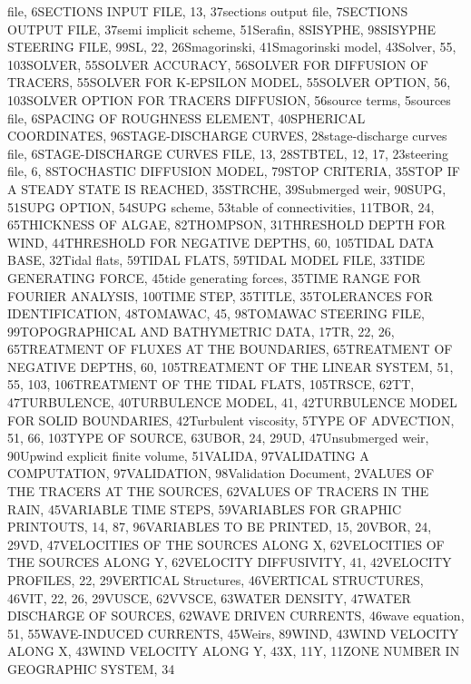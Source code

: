 file, 6SECTIONS INPUT FILE, 13, 37sections output file, 7SECTIONS OUTPUT FILE, 37semi implicit scheme, 51Serafin, 8SISYPHE, 98SISYPHE STEERING FILE, 99SL, 22, 26Smagorinski, 41Smagorinski model, 43Solver, 55, 103SOLVER, 55SOLVER ACCURACY, 56SOLVER FOR DIFFUSION OF TRACERS, 55SOLVER FOR K-EPSILON  MODEL, 55SOLVER OPTION, 56, 103SOLVER OPTION FOR TRACERS DIFFUSION, 56source terms, 5sources file, 6SPACING OF ROUGHNESS ELEMENT, 40SPHERICAL COORDINATES, 96STAGE-DISCHARGE CURVES, 28stage-discharge curves file, 6STAGE-DISCHARGE CURVES FILE, 13, 28STBTEL, 12, 17, 23steering file, 6, 8STOCHASTIC DIFFUSION MODEL, 79STOP CRITERIA, 35STOP IF A STEADY STATE IS REACHED, 35STRCHE, 39Submerged weir, 90SUPG, 51SUPG OPTION, 54SUPG scheme, 53table of connectivities, 11TBOR, 24, 65THICKNESS OF ALGAE, 82THOMPSON, 31THRESHOLD DEPTH FOR WIND, 44THRESHOLD FOR NEGATIVE DEPTHS, 60, 105TIDAL DATA BASE, 32Tidal flats, 59TIDAL FLATS, 59TIDAL MODEL FILE, 33TIDE GENERATING FORCE, 45tide generating forces, 35TIME RANGE FOR FOURIER ANALYSIS, 100TIME STEP, 35TITLE, 35TOLERANCES FOR IDENTIFICATION, 48TOMAWAC, 45, 98TOMAWAC STEERING FILE, 99TOPOGRAPHICAL AND BATHYMETRIC DATA, 17TR, 22, 26, 65TREATMENT OF FLUXES AT THE BOUNDARIES, 65TREATMENT OF NEGATIVE DEPTHS, 60, 105TREATMENT OF THE LINEAR SYSTEM, 51, 55, 103, 106TREATMENT OF THE TIDAL FLATS, 105TRSCE, 62TT, 47TURBULENCE, 40TURBULENCE MODEL, 41, 42TURBULENCE MODEL FOR SOLID BOUNDARIES, 42Turbulent viscosity, 5TYPE OF ADVECTION, 51, 66, 103TYPE OF SOURCE, 63UBOR, 24, 29UD, 47Unsubmerged weir, 90Upwind explicit finite volume, 51VALIDA, 97VALIDATING A COMPUTATION, 97VALIDATION, 98Validation Document, 2VALUES OF THE TRACERS AT THE SOURCES, 62VALUES OF TRACERS IN THE RAIN, 45VARIABLE TIME STEPS, 59VARIABLES FOR GRAPHIC PRINTOUTS, 14, 87, 96VARIABLES TO BE PRINTED, 15, 20VBOR, 24, 29VD, 47VELOCITIES OF THE SOURCES ALONG X, 62VELOCITIES OF THE SOURCES ALONG Y, 62VELOCITY DIFFUSIVITY, 41, 42VELOCITY PROFILES, 22, 29VERTICAL Structures, 46VERTICAL STRUCTURES, 46VIT, 22, 26, 29VUSCE, 62VVSCE, 63WATER DENSITY, 47WATER DISCHARGE OF SOURCES, 62WAVE DRIVEN CURRENTS, 46wave equation, 51, 55WAVE-INDUCED CURRENTS, 45Weirs, 89WIND, 43WIND VELOCITY ALONG X, 43WIND VELOCITY ALONG Y, 43X, 11Y, 11ZONE NUMBER IN GEOGRAPHIC SYSTEM, 34






